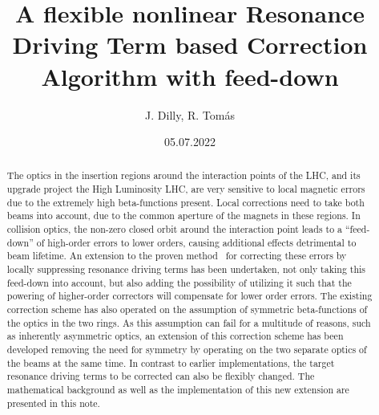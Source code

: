 \documentclass[dvipsnames]{simplenote}    %
\date{05.07.2022}
\title{A flexible nonlinear Resonance Driving Term based Correction Algorithm with feed-down}
\author{J. Dilly, R. Tom\'as}
\begin{document}
\graphicspath{
    {./images/}
}
\maketitle 

\begin{abstract}
The optics in the insertion regions around the interaction points of the LHC, and its upgrade project the High Luminosity LHC, 
are very sensitive to local magnetic errors due to the extremely high beta-functions present.
Local corrections need to take both beams into account, due to the common aperture of the magnets in these regions.
In collision optics, the non-zero closed orbit around the interaction point leads to a ``feed-down'' of high-order errors to lower orders, 
causing additional effects detrimental to beam lifetime. 
An extension to the proven method~\cite{BruningDynamicApertureStudies2004} for correcting these errors by locally suppressing resonance driving terms has been undertaken, 
not only taking this feed-down into account, but also adding the possibility of utilizing it such that the powering of higher-order correctors will compensate 
for lower order errors.
The existing correction scheme has also operated on the assumption of symmetric beta-functions of the optics in the two rings.
As this assumption can fail for a multitude of reasons, such as inherently asymmetric optics, 
an extension of this correction scheme has been developed removing the need for symmetry by operating on the two separate optics of the beams at the same time.
In contrast to earlier implementations, the target resonance driving terms to be corrected can also be flexibly changed. 
The mathematical background as well as the implementation of this new extension are presented in this note.
\end{abstract}


\tableofcontents
\newpage





\FloatBarrier


\FloatBarrier


\FloatBarrier


\FloatBarrier


\FloatBarrier



\clearpage

% 
\end{document}
